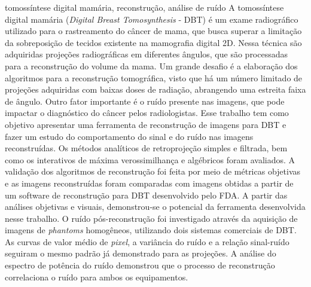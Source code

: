 \documentclass[dissertmst]{eesc}
\begin{document}
\begin{resumo}{tomossíntese digital mamária, reconstrução, análise de ruído}
A tomossíntese digital mamária (\textit{Digital Breast Tomosynthesis} - \acs{DBT}) é um exame radiográfico utilizado para o rastreamento do câncer de mama, que busca superar a limitação da sobreposição de tecidos existente na mamografia digital \acs{2D}. Nessa técnica são adquiridas projeções radiográficas em diferentes ângulos, que são processadas para a reconstrução do volume da mama. Um grande desafio é a elaboração dos algoritmos para a reconstrução tomográfica, visto que há um número limitado de projeções adquiridas com baixas doses de radiação, abrangendo uma estreita faixa de ângulo. Outro fator importante é o ruído presente nas imagens, que pode impactar o diagnóstico do câncer pelos radiologistas. Esse trabalho tem como objetivo apresentar uma ferramenta de reconstrução de imagens para \acs{DBT} e fazer um estudo do comportamento do sinal e do ruído nas imagens reconstruídas. Os métodos analíticos de retroprojeção simples e  filtrada, bem como os interativos de máxima verossimilhança e algébricos foram avaliados. A validação dos algoritmos de reconstrução foi feita por meio de métricas objetivas e as imagens reconstruídas foram comparadas com imagens obtidas a partir de um software de reconstrução para \acs{DBT} desenvolvido pelo \ac{FDA}. A partir das análises objetivas e visuais, demonstrou-se o potencial da ferramenta desenvolvida nesse trabalho. O ruído pós-reconstrução foi investigado através da aquisição de imagens de \textit{phantoms} homogêneos, utilizando dois sistemas comerciais de \acs{DBT}. As curvas de valor médio de \textit{pixel}, a variância do ruído e a relação sinal-ruído seguiram o mesmo padrão já demonstrado para as projeções. A análise do espectro de potência do ruído demonstrou que o processo de reconstrução correlaciona o ruído para ambos os equipamentos.

\end{resumo}
\end{document}
